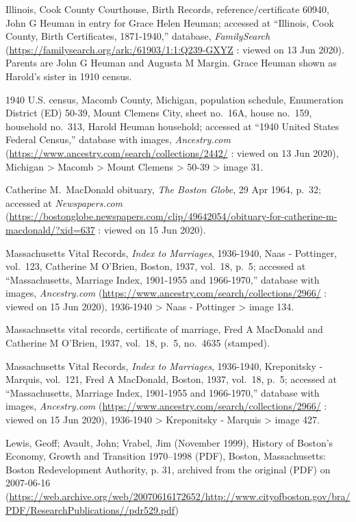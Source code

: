 \begin{thebibliography}{999}
	Illinois, Cook County Courthouse, Birth Records, reference/certificate 60940, John G Heuman in entry for Grace Helen Heuman; accessed at ``Illinois, Cook County, Birth Certificates, 1871-1940,'' database, \textit{FamilySearch} (\url{https://familysearch.org/ark:/61903/1:1:Q239-GXYZ} : viewed on 13 Jun 2020).\\
	Parents are John G Heuman and Augusta M Margin. Grace Heuman shown as Harold's sister in 1910 census.
	
	1940 U.S. census, Macomb County, Michigan, population schedule, Enumeration District (ED) 50-39, Mount Clemens City, sheet no.\ 16A, house no.\ 159, household no.\ 313, Harold Heuman household; accessed at ``1940 United States Federal Census,'' database with images, \textit{Ancestry.com} (\url{https://www.ancestry.com/search/collections/2442/} : viewed on 13 Jun 2020), Michigan > Macomb > Mount Clemens > 50-39 > image 31.
	
	Catherine M.\ MacDonald obituary, \textit{The Boston Globe}, 29 Apr 1964, p.\ 32; accessed at \textit{Newspapers.com} (\url{https://bostonglobe.newspapers.com/clip/49642054/obituary-for-catherine-m-macdonald/?xid=637} : viewed on 15 Jun 2020).
	
	Massachusetts Vital Records, \textit{Index to Marriages}, 1936-1940, Naas - Pottinger, vol.\ 123, Catherine M O'Brien, Boston, 1937, vol.\ 18, p.\ 5; accessed at ``Massachusetts, Marriage Index, 1901-1955 and 1966-1970,'' database with images, \textit{Ancestry.com} (\url{https://www.ancestry.com/search/collections/2966/} : viewed on 15 Jun 2020), 1936-1940 > Naas - Pottinger > image 134.
	
	Massachusetts vital records, certificate of marriage, Fred A MacDonald and Catherine M O'Brien, 1937, vol.\ 18, p.\ 5, no.\ 4635 (stamped).
	
	Massachusetts Vital Records, \textit{Index to Marriages}, 1936-1940, Kreponitsky - Marquis, vol.\ 121, Fred A MacDonald, Boston, 1937, vol.\ 18, p.\ 5; accessed at ``Massachusetts, Marriage Index, 1901-1955 and 1966-1970,'' database with images, \textit{Ancestry.com} (\url{https://www.ancestry.com/search/collections/2966/} : viewed on 15 Jun 2020), 1936-1940 > Kreponitsky - Marquis > image 427.
	
	Lewis, Geoff; Avault, John; Vrabel, Jim (November 1999), History of Boston's Economy, Growth and Transition 1970–1998 (PDF), Boston, Massachusetts: Boston Redevelopment Authority, p. 31, archived from the original (PDF) on 2007-06-16 (\url{https://web.archive.org/web/20070616172652/http://www.cityofboston.gov/bra/PDF/ResearchPublications//pdr529.pdf})
	

\end{thebibliography}
